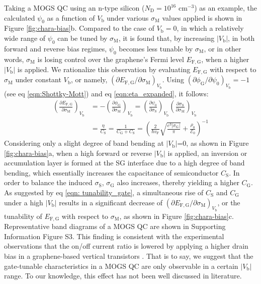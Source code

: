 \documentclass[journal=nalefd]{achemso}
\newcommand*\subs[1]{_{\text{#1}}} %
\begin{document}
Taking a MOGS QC using an n-type silicon ($N\subs{D} = 10^{16}$ cm$^{-3}$) as an example, the calculated $\psi_0$ as a function of $V\subs{b}$ under various $\sigma\subs{M}$ values applied is shown in Figure \ref{fig:chara-bias}b.
Compared to the case of $V\subs{b} = 0$, in which a relatively wide range of $\psi_0$ can be tuned by $\sigma\subs{M}$, it is found that, by increasing $|V\subs{b}|$, in both forward and reverse bias regimes, $\psi_0$ becomes less tunable by $\sigma\subs{M}$, or in other words, $\sigma\subs{M}$ is losing control over the graphene's Fermi level $E_{\mathrm {F,G}}$, when a higher $|V\subs{b}|$ is applied. 
We rationalize this observation by evaluating $E_{\mathrm {F,G}}$ with respect to $\sigma\subs{M}$ under constant $V\subs{b}$, or namely, $(\partial E_{\mathrm {F,G}}/\partial \sigma\subs{M})_{V\subs{b}}$.
Using $(\partial \phi\subs{G}/\partial \psi_0)_{V\subs{b}}=-1$ (see eq \ref{eqn:Shottky-Mott}) and eq \ref{eqn:eta_expanded}, it follows:
\begin{equation}
  \label{eqn: tunability_gate}
  \begin{aligned}
      \left(\frac{\partial E_{\mathrm {F,G}}}{\partial \sigma\subs{M}}\right)_{V\subs{b}} &= -\left(\frac{\partial \phi\subs{G}}{\partial \sigma\subs{M}}\right)_{V\subs{b}} = \left(\frac{\partial \psi_0}{\partial \sigma\subs{S}}\right)_{V\subs{b}} \left(\frac{\partial \sigma\subs{S}}{\partial \sigma\subs{M}}\right)_{V\subs{b}}\\
      &= \frac{\eta}{C\subs{S}} = \frac{1}{C\subs{G}+C\subs{S}}= (\frac{2}{\hbar v\subs{F}} \sqrt{\frac{e^3 |\sigma\subs{G}|}{\pi}} + \frac{\rho_0}{\mathscr{E}_0})^{-1}
  \end{aligned}
\end{equation}
Considering only a slight degree of band bending at $|V\subs{b}|$=0, as shown in Figure \ref{fig:chara-bias}a, when a high forward or reverse $|V\subs{b}|$ is applied, an inversion or accumulation layer is formed at the SG interface due to a high degree of band bending, which essentially increases the capacitance of semiconductor $C\subs{S}$. 
In order to balance the induced $\sigma\subs{S}$, $\sigma\subs{G}$ also increases, thereby yielding a higher $C\subs{G}$. 
As suggested by eq \ref{eqn: tunability_gate}, a simultaneous rise of $C\subs{S}$ and $C\subs{G}$ under a high $|V\subs{b}|$ results in a significant decrease of $(\partial E_{\mathrm {F,G}}/\partial \sigma\subs{M})_{V\subs{b}}$, or the tunability of $E_{\mathrm {F,G}}$ with respect to $\sigma\subs{M}$, as shown in Figure \ref{fig:chara-bias}c. 
Representative band diagrams of a MOGS QC are shown in Supporting Information Figure S3.
This finding is consistent with the experimental observations that the on/off current ratio is lowered by applying a higher drain bias in a graphene-based vertical transistors \cite{Yang2012Graphene, yu2013vertically, georgiou2013vertical, Shih2015PartiallyScreened, Schwierz2010Graphene}.
That is to say, we suggest that the gate-tunable characteristics in a MOGS QC are only observable in a certain $|V\subs{b}|$ range.
To our knowledge, this effect has not been well discussed in literature.
 
\end{document}
